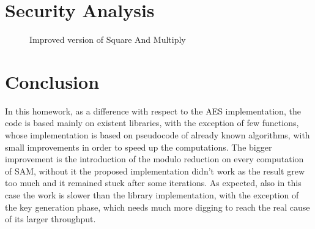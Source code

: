 \documentclass{article}
\begin{document}

\section{Security Analysis}

\begin{figure}[H]
	\centering
	\caption{Improved version of Square And Multiply}
	\label{fig:sam}
\end{figure}


\section{Conclusion}

In this homework, as a difference with respect to the AES implementation, the code is based mainly on existent libraries, with the exception of few functions, whose implementation is based on pseudocode of already known algorithms, with small improvements in order to speed up the computations. The bigger improvement is the introduction of the modulo reduction on every computation of SAM, without it the proposed implementation didn't work as the result grew too much and it remained stuck after some iterations. As expected, also in this case the work is slower than the library implementation, with the exception of the key generation phase, which needs much more digging to reach the real cause of its larger throughput.






\end{document}
